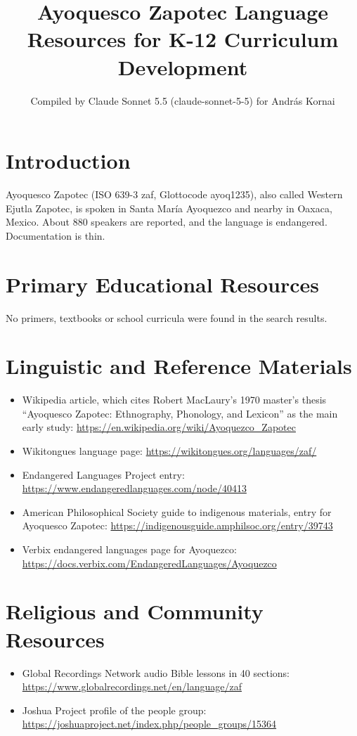 \documentclass[12pt]{article}
\title{Ayoquesco Zapotec Language Resources for K-12 Curriculum Development}
\author{Compiled by Claude Sonnet 5.5 (claude-sonnet-5-5) for Andr\'as Kornai}
\date{}
\begin{document}
\maketitle

\section{Introduction}
Ayoquesco Zapotec (ISO 639-3 zaf, Glottocode ayoq1235), also called Western Ejutla Zapotec, is spoken in Santa Mar\'ia Ayoquezco and nearby in Oaxaca, Mexico. About 880 speakers are reported, and the language is endangered. Documentation is thin.

\section{Primary Educational Resources}
No primers, textbooks or school curricula were found in the search results.

\section{Linguistic and Reference Materials}
\begin{itemize}
\item Wikipedia article, which cites Robert MacLaury's 1970 master's thesis ``Ayoquesco Zapotec: Ethnography, Phonology, and Lexicon'' as the main early study: \url{https://en.wikipedia.org/wiki/Ayoquezco_Zapotec}
\item Wikitongues language page: \url{https://wikitongues.org/languages/zaf/}
\item Endangered Languages Project entry: \url{https://www.endangeredlanguages.com/node/40413}
\item American Philosophical Society guide to indigenous materials, entry for Ayoquesco Zapotec: \url{https://indigenousguide.amphilsoc.org/entry/39743}
\item Verbix endangered languages page for Ayoquezco: \url{https://docs.verbix.com/EndangeredLanguages/Ayoquezco}
\end{itemize}

\section{Religious and Community Resources}
\begin{itemize}
\item Global Recordings Network audio Bible lessons in 40 sections: \url{https://www.globalrecordings.net/en/language/zaf}
\item Joshua Project profile of the people group: \url{https://joshuaproject.net/index.php/people_groups/15364}
\end{itemize}
\end{document}
